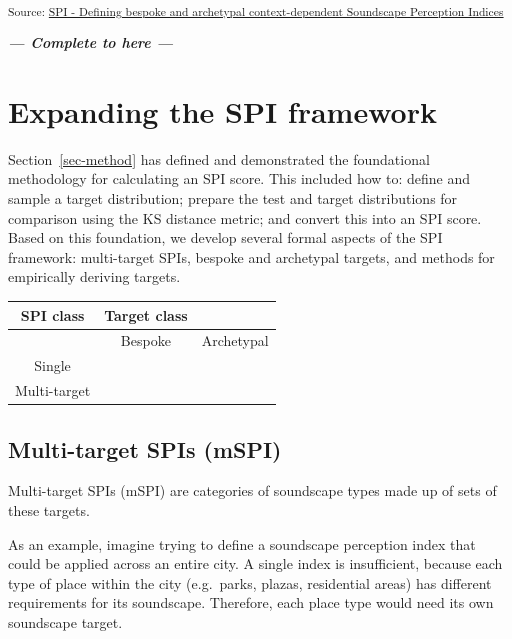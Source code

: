 \documentclass[
  authoryear,
  preprint,
  3p]{elsarticle}
\begin{document}
\textsubscript{Source:
\href{https://MitchellAcoustics.github.io/J2401_JASA_SSID-Single-Index/notebooks/SingleIndex-Code.ipynb.html\#cell-tbl-ex-spis}{SPI
- Defining bespoke and archetypal context-dependent Soundscape
Perception Indices}}

\textbf{\emph{--- Complete to here ---}}

\section{Expanding the SPI framework}\label{expanding-the-spi-framework}

Section~\ref{sec-method} has defined and demonstrated the foundational
methodology for calculating an SPI score. This included how to: define
and sample a target distribution; prepare the test and target
distributions for comparison using the KS distance metric; and convert
this into an SPI score. Based on this foundation, we develop several
formal aspects of the SPI framework: multi-target SPIs, bespoke and
archetypal targets, and methods for empirically deriving targets.

\begin{longtable}[]{@{}ccc@{}}
\toprule\noalign{}
SPI class & Target class & \\
\midrule\noalign{}
\endhead
\bottomrule\noalign{}
\endlastfoot
& Bespoke & Archetypal \\
Single & & \\
Multi-target & & \\
\end{longtable}

\subsection{Multi-target SPIs (mSPI)}\label{sec-mSPI}

Multi-target SPIs (mSPI) are categories of soundscape types made up of
sets of these targets.

As an example, imagine trying to define a soundscape perception index
that could be applied across an entire city. A single index is
insufficient, because each type of place within the city (e.g.~parks,
plazas, residential areas) has different requirements for its
soundscape. Therefore, each place type would need its own soundscape
target.
\end{document}
